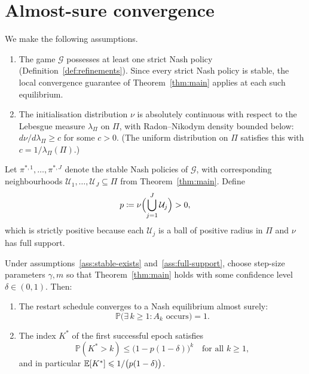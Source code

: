 \documentclass[a4paper,oneside,11pt]{report}
\newcommand{\Prob}{\mathbb{P}}
\newcommand{\calG}{\mathcal{G}}
\newcommand{\calU}{\mathcal{U}}
\numberwithin{theorem}{chapter}
\numberwithin{equation}{chapter}
\begin{document}
\section{Almost-sure convergence}
\label{sec:as-convergence}

We make the following assumptions.

\begin{enumerate}[label=(A\arabic*)]
\item \label{ass:stable-exists} The game $\calG$ possesses at least one
  strict Nash policy (Definition~\ref{def:refinements}).
  Since every strict Nash policy is stable, the local convergence
  guarantee of Theorem~\ref{thm:main} applies at each such
  equilibrium.
\item \label{ass:full-support} The initialisation distribution $\nu$ is
  absolutely continuous with respect to the Lebesgue measure
  $\lambda_\Pi$ on $\Pi$, with Radon--Nikodym density bounded below:
  $d\nu / d\lambda_\Pi \ge c$ for some $c > 0$. (The uniform
  distribution on $\Pi$ satisfies this with
  $c = 1/\lambda_\Pi(\Pi)$.)
\end{enumerate}

Let $\pi^{*,1}, \ldots, \pi^{*,J}$ denote the stable Nash policies of
$\calG$, with corresponding neighbourhoods
$\calU_1, \ldots, \calU_J \subseteq \Pi$ from Theorem~\ref{thm:main}.
Define
\begin{equation}
  \label{eq:basin-prob}
  p \coloneqq \nu\Bigl(\bigcup_{j=1}^J \calU_j\Bigr) > 0,
\end{equation}
which is strictly positive because each $\calU_j$ is a ball of positive
radius in $\Pi$ and $\nu$ has full support.

\begin{theorem}
  \label{thm:global}
  Under assumptions~\ref{ass:stable-exists}
  and~\ref{ass:full-support}, choose step-size parameters $\gamma, m$
  so that Theorem~\ref{thm:main} holds with some confidence level
  $\delta \in (0,1)$. Then:
  \begin{enumerate}[label=\textup{(\alph*)}]
  \item The restart schedule converges to a Nash equilibrium almost
    surely:
    \begin{equation}
      \label{eq:global-as}
      \Prob\bigl(\exists\, k \ge 1 : A_k \text{ occurs}\bigr) = 1.
    \end{equation}
  \item The index $K^*$ of the first successful epoch satisfies
    \begin{equation}
      \label{eq:geom-bound}
      \Prob(K^* > k) \le \bigl(1 - p(1-\delta)\bigr)^k
      \quad \text{for all } k \ge 1,
    \end{equation}
    and in particular $\mathbb{E}[K^*] \leqslant 1/\bigl(p(1-\delta)\bigr)$.
  \end{enumerate}
\end{theorem}
\end{document}
